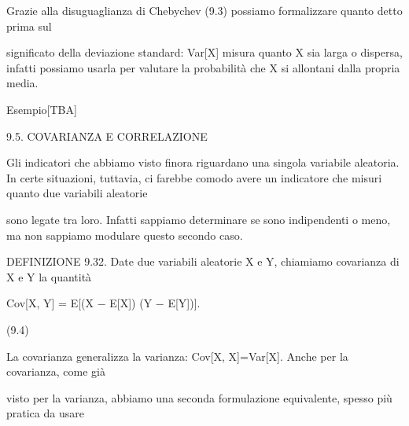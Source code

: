 \documentclass[a4paper,portrait,12pt]{article}
\begin{document}
\begin{flushleft}
Grazie alla disuguaglianza di Chebychev (9.3) possiamo formalizzare quanto detto prima sul
\end{flushleft}


\begin{flushleft}
significato della deviazione standard: Var[X] misura quanto X sia larga o dispersa, infatti possiamo usarla per valutare la probabilit\`{a} che X si allontani dalla propria media.
\end{flushleft}


\begin{flushleft}
Esempio[TBA]
\end{flushleft}





\begin{flushleft}
9.5. COVARIANZA E CORRELAZIONE
\end{flushleft}


\begin{flushleft}
Gli indicatori che abbiamo visto finora riguardano una singola variabile aleatoria. In certe situazioni, tuttavia, ci farebbe comodo avere un indicatore che misuri quanto due variabili aleatorie
\end{flushleft}


\begin{flushleft}
sono legate tra loro. Infatti sappiamo determinare se sono indipendenti o meno, ma non sappiamo modulare questo secondo caso.
\end{flushleft}


\begin{flushleft}
DEFINIZIONE 9.32. Date due variabili aleatorie X e Y, chiamiamo covarianza di X e Y la quantit\`{a}
\end{flushleft}


\begin{flushleft}
Cov[X, Y] = E[(X $-$ E[X]) (Y $-$ E[Y])].
\end{flushleft}





(9.4)





\begin{flushleft}
La covarianza generalizza la varianza: Cov[X, X]=Var[X]. Anche per la covarianza, come gi\`{a}
\end{flushleft}


\begin{flushleft}
visto per la varianza, abbiamo una seconda formulazione equivalente, spesso più pratica da usare
\end{flushleft}
\end{document}

